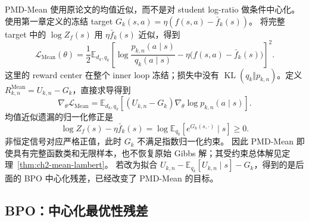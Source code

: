 \documentclass[lang=cn,scheme=chinese,openany]{../book/elegantbook}
\begin{document}
PMD-Mean 使用原论文的均值近似，而不是对 student log-ratio 做条件中心化。使用第一章定义的冻结 target $G_k(s,a)=\eta(f(s,a)-\bar f_k(s))$。
将完整 target 中的 $\log Z_f(s)$ 用 $\eta\bar f_k(s)$ 近似，得到
\begin{equation}
\mathcal L_{\mathrm{Mean}}(\theta)
=\frac12\mathbb E_{d_k, q_k}
\left[\log\frac{ p_{k,n}(a\mid s)}{ q_k(a\mid s)}
-\eta\bigl(f(s,a)-\bar f_k(s)\bigr)\right]^2.
\label{eq:ch2-mean-loss-bridge}
\end{equation}
这里的 reward center 在整个 inner loop 冻结；损失中没有
$\operatorname{KL}( q_k\Vert p_{k,n})$。定义 $R_{k,n}^{\mathrm{Mean}}=U_{k,n}-G_k$，直接求导得到
\begin{equation}
\nabla_\theta\mathcal L_{\mathrm{Mean}}
=\mathbb E_{d_k, q_k}
\left[(U_{k,n}-G_k)\nabla_\theta\log p_{k,n}(a\mid s)\right].
\label{eq:ch2-mean-gradient-bridge}
\end{equation}
均值近似遗漏的归一化修正是
\begin{equation*}
\log Z_f(s)-\eta\bar f_k(s)
=\log\mathbb E_{ q_k}[e^{G_k(s,\cdot)}\mid s]\ge0.
\end{equation*}
非恒定信号对应严格正值，此时 $G_k$ 不满足指数归一化约束。
因此 PMD-Mean 即使具有完整函数类和无限样本，也不恢复原始 Gibbs 解；其受约束总体解见定理~\ref{thm:ch2-mean-lambert}。
若改为拟合 $U_{k,n}-\mathbb E_{ q_k}[U_{k,n}\mid s]-G_k$，得到的是后面的 BPO 中心化残差，已经改变了 PMD-Mean 的目标。

\subsection{BPO：中心化最优性残差}
\label{subsec:ch2-bpo-loss-derivation}
\end{document}
